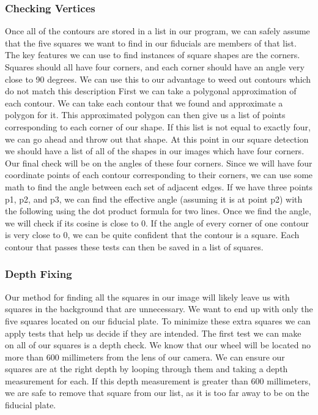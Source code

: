 \documentclass[onecolumn, draftclsnofoot,10pt, compsoc]{IEEEtran}
\begin{document}
\subsubsection{Checking Vertices}
Once all of the contours are stored in a list in our program, we can safely assume that the five squares we want to find in our fiducials are members of that list.  The key features we can use to find instances of square shapes are the corners.  Squares should all have four corners, and each corner should have an angle very close to 90 degrees.  We can use this to our advantage to weed out contours which do not match this description
\newline
\newline
First we can take a polygonal approximation of each contour.  We can take each contour that we found and approximate a polygon for it.  This approximated polygon can then give us a list of points corresponding to each corner of our shape.  If this list is not equal to exactly four, we can go ahead and throw out that shape.
\newline
\newline
At this point in our square detection we should have a list of all of the shapes in our images which have four corners.  Our final check will be on the angles of these four corners.  Since we will have four coordinate points of each contour corresponding to their corners, we can use some math to find the angle between each set of adjacent edges.  If we have three points p1, p2, and p3,  we can find the effective angle (assuming it is at point p2) with the following using the dot product  formula for two lines.  Once we find the angle, we will check if its cosine is close to 0.  If the angle of every corner of one contour is very close to 0, we can be quite confident that the contour is a square.  Each contour that passes these tests can then be saved in a list of squares.
\subsubsection{Depth Fixing}
Our method for finding all the squares in our image will likely leave us with squares in the background that are unnecessary.  We want to end up with only the five squares located on our fiducial plate.  To minimize these extra squares we can apply tests that help us decide if they are intended. The first test we can make on all of our squares is a depth check.  We know that our wheel will be located no more than 600 millimeters from the lens of our camera. We can ensure our squares are at the right depth by looping through them and taking a depth measurement for each.  If this depth measurement is greater than 600 millimeters, we are safe to remove that square from our list, as it is too far away to be on the fiducial plate.
\end{document}
